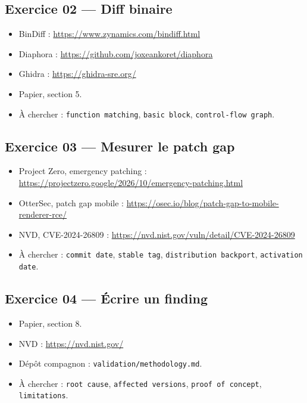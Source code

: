 \documentclass{training}
\begin{document}
\subsection*{Exercice 02 --- Diff binaire}
\begin{itemize}
  \item BinDiff : \url{https://www.zynamics.com/bindiff.html}
  \item Diaphora : \url{https://github.com/joxeankoret/diaphora}
  \item Ghidra : \url{https://ghidra-sre.org/}
  \item Papier, section 5.
  \item À chercher : \texttt{function matching}, \texttt{basic block},
        \texttt{control-flow graph}.
\end{itemize}

\subsection*{Exercice 03 --- Mesurer le patch gap}
\begin{itemize}
  \item Project Zero, emergency patching :
        \url{https://projectzero.google/2026/10/emergency-patching.html}
  \item OtterSec, patch gap mobile :
        \url{https://osec.io/blog/patch-gap-to-mobile-renderer-rce/}
  \item NVD, CVE-2024-26809 :
        \url{https://nvd.nist.gov/vuln/detail/CVE-2024-26809}
  \item À chercher : \texttt{commit date}, \texttt{stable tag},
        \texttt{distribution backport}, \texttt{activation date}.
\end{itemize}

\subsection*{Exercice 04 --- Écrire un finding}
\begin{itemize}
  \item Papier, section 8.
  \item NVD : \url{https://nvd.nist.gov/}
  \item Dépôt compagnon : \texttt{validation/methodology.md}.
  \item À chercher : \texttt{root cause}, \texttt{affected versions},
        \texttt{proof of concept}, \texttt{limitations}.
\end{itemize}
\end{document}
